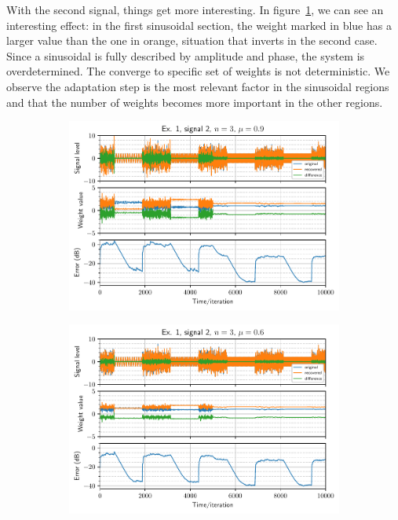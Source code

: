 With the second signal, things get more interesting. In
figure~\ref{fig:ex1sig2switch}, we can see an interesting effect: in the first
sinusoidal section, the weight marked in blue has a larger value than the one in
orange, situation that inverts in the second case. Since a sinusoidal is fully
described by amplitude and phase, the system is overdetermined. The converge to
specific set of weights is not deterministic. We observe the adaptation step is
the most relevant factor in the sinusoidal regions and that the number of weights
becomes more important in the other regions.
\begin{figure}
    \centering
    \begin{subfigure}[t]{0.30\columnwidth}
        \centering
        \includegraphics[width=\columnwidth]{figures/pdf/ex1_l2_n3_mu90.pdf}
        \caption{\label{fig:ex1sig2switch}}
    \end{subfigure} %
    \begin{subfigure}[t]{0.30\columnwidth}
        \centering
        \includegraphics[width=\columnwidth]{figures/pdf/ex1_l2_n3_mu60.pdf}

\end{subfigure}
\end{figure}
